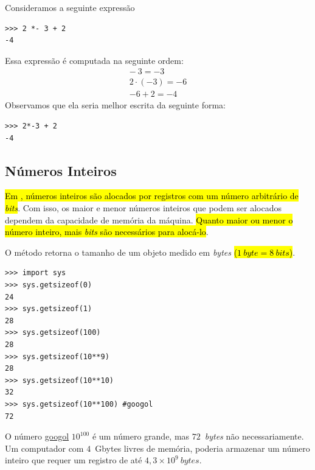 \begin{ex}
  Consideramos a seguinte expressão

\begin{lstlisting}
>>> 2 *- 3 + 2
-4
\end{lstlisting}

  Essa expressão é computada na seguinte ordem:
  \begin{gather}
    -~3 = -3\\
    2\cdot(-3) = -6\\
    -6 + 2 = -4
  \end{gather}
  Observamos que ela seria melhor escrita da seguinte forma:

\begin{lstlisting}
>>> 2*-3 + 2
-4
\end{lstlisting}

\end{ex}

\subsection{Números Inteiros}

\hl{Em {\python}, números inteiros são alocados por registros com um número arbitrário de \textit{bits}}. Com isso, os maior e menor números inteiros que podem ser alocados dependem da capacidade de memória da máquina. \hl{Quanto maior ou menor o número inteiro, mais \textit{bits} são necessários para alocá-lo}.

\begin{ex}
  O método {\python} {\PYTHONsysDOTgetsizeof} retorna o tamanho de um objeto medido em \textit{bytes} \hl{($1~\textit{byte} = 8~\textit{bits}$)}.

\begin{lstlisting}
>>> import sys
>>> sys.getsizeof(0)
24
>>> sys.getsizeof(1)
28
>>> sys.getsizeof(100)
28
>>> sys.getsizeof(10**9)
28
>>> sys.getsizeof(10**10)
32
>>> sys.getsizeof(10**100) #googol
72
\end{lstlisting}

  O número \href{https://en.wikipedia.org/wiki/Googol}{googol} $10^{100}$ é um número grande, mas $72$~\textit{bytes} não necessariamente. Um computador com $4$~Gbytes livres de memória, poderia armazenar um número inteiro que requer um registro de até $4,3\times 10^9~\textit{bytes}$.
\end{ex}

